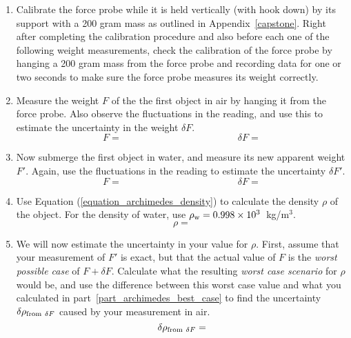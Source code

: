 \begin{enumerate}[labparts]
\item Calibrate the force probe while it is held vertically (with hook down) by its support with a 200 gram mass as outlined in Appendix~\ref{capstone}. Right after completing the calibration procedure and also before each one of the following weight measurements, check the calibration of the force probe by hanging a 200 gram mass from the force probe and recording data for one or two seconds to make sure the force probe measures its weight correctly. 


\item Measure the weight $F$ of the the first object in air by hanging it from the force probe.  Also observe the fluctuations in the reading, and use this to estimate the uncertainty in the weight $\delta F$.
\medskip
$$
F= \hspace{2in}
\delta F =
$$

\item Now submerge the first object in water, and measure its new apparent weight $F'$.  Again, use the fluctuations in the reading to estimate the uncertainty $\delta F'$.
\medskip
$$
F= \hspace{2in}
\delta F =
$$

\item Use Equation (\ref{equation_archimedes_density}) to calculate the density $\rho$ of the object.  For the density of water, use $\rho_{\rm w}=0.998 \times 10^3$~kg/m$^3$. \label{part_archimedes_best_case}
\answerspace{0.75in}
$$
\rho =
$$

\item We will now estimate the uncertainty in your value for $\rho$.  First, assume that your measurement of $F'$ is exact, but that the actual value of $F$ is the \textit{worst possible case} of $F + \delta F$.  Calculate what the resulting \textit{worst case scenario} for $\rho$ would be, and use the difference between this worst case value and what you calculated in part~\ref{part_archimedes_best_case} to find the uncertainty $\delta \rho_{{\rm from~} \delta F}$ caused by your measurement in air.
\answerspace{0.75in}
$$
\delta \rho_{{\rm from~} \delta F} =
$$


\end{enumerate}
